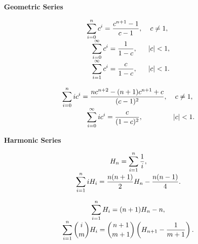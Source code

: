 \textbf{Geometric Series}

\[
\begin{array}{>{\displaystyle}c>{\displaystyle}c}
    \sum_{i=0}^{n} c^i = \frac{c^{n+1}-1}{c-1}, & c \neq 1, \\
    \sum_{i=0}^{\infty} c^i = \frac{1}{1-c}, & |c| < 1, \\
    \sum_{i=1}^{\infty} c^i = \frac{c}{1-c}, & |c| < 1. \\
\end{array}
\]

\[
\begin{array}{>{\displaystyle}c>{\displaystyle}c}
    \sum_{i=0}^{n} i c^i = \frac{nc^{n+2}-(n+1)c^{n+1}+c}{(c-1)^2}, & c \neq 1, \\
    \sum_{i=0}^{\infty} i c^i = \frac{c}{(1-c)^2}, & |c| < 1. \\
\end{array}
\]

\textbf{Harmonic Series}

\[
\begin{array}{>{\displaystyle}c}
    H_n = \sum_{i=1}^{n} \frac{1}{i}, \\
    \sum_{i=1}^{n} iH_i = \frac{n(n+1)}{2} H_n - \frac{n(n-1)}{4}. \\
\end{array}
\]

\[
\begin{array}{>{\displaystyle}c}
    \sum_{i=1}^{n} H_i = (n+1) H_n - n, \\
    \sum_{i=1}^{n} \binom{i}{m} H_i = \binom{n+1}{m+1} \left( H_{n+1} - \frac{1}{m+1} \right).
\end{array}
\]
